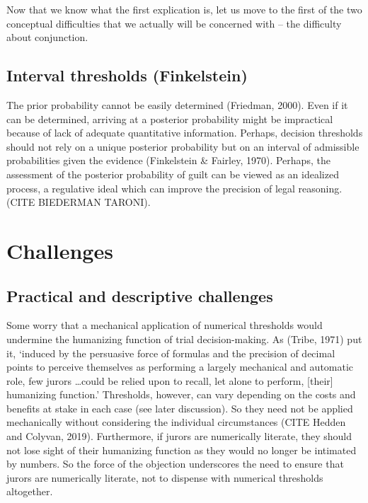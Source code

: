\documentclass[10pt,dvipsnames,enabledeprecatedfontcommands]{scrartcl}
\begin{document}
Now that we know what the first explication is, let us move to the first
of the two conceptual difficulties that we actually will be concerned
with -- the difficulty about conjunction.

\subsection{Interval thresholds
(Finkelstein)}\label{interval-thresholds-finkelstein}

The prior probability cannot be easily determined (Friedman, 2000). Even
if it can be determined, arriving at a posterior probability might be
impractical because of lack of adequate quantitative information.
Perhaps, decision thresholds should not rely on a unique posterior
probability but on an interval of admissible probabilities given the
evidence (Finkelstein \& Fairley, 1970). Perhaps, the assessment of the
posterior probability of guilt can be viewed as an idealized process, a
regulative ideal which can improve the precision of legal reasoning.
(CITE BIEDERMAN TARONI).

\section{Challenges}\label{challenges}

\subsection{Practical and descriptive
challenges}\label{practical-and-descriptive-challenges}

Some worry that a mechanical application of numerical thresholds would
undermine the humanizing function of trial decision-making. As (Tribe,
1971) put it, `induced by the persuasive force of formulas and the
precision of decimal points to perceive themselves as performing a
largely mechanical and automatic role, few jurors \dots could be relied
upon to recall, let alone to perform, {[}their{]} humanizing function.'
Thresholds, however, can vary depending on the costs and benefits at
stake in each case (see later discussion). So they need not be applied
mechanically without considering the individual circumstances (CITE
Hedden and Colyvan, 2019). Furthermore, if jurors are numerically
literate, they should not lose sight of their humanizing function as
they would no longer be intimated by numbers. So the force of the
objection underscores the need to ensure that jurors are numerically
literate, not to dispense with numerical thresholds altogether.
\end{document}
